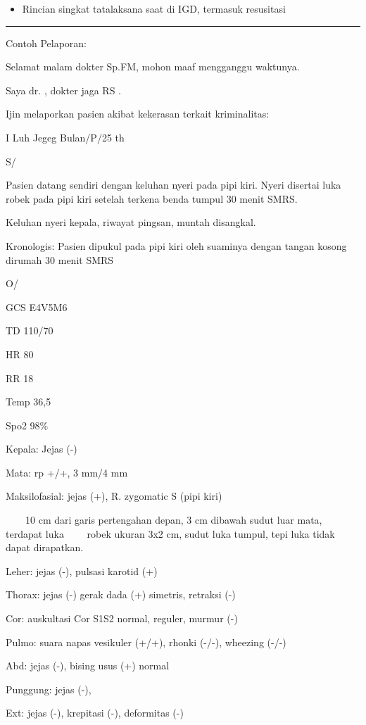 \documentclass[
]{book}
\providecommand{\tightlist}{%
  \setlength{\itemsep}{0pt}\setlength{\parskip}{0pt}}
\begin{document}
\begin{itemize}
\tightlist
\item
  Rincian singkat tatalaksana saat di IGD, termasuk resusitasi
\end{itemize}

\begin{center}\rule{0.5\linewidth}{0.5pt}\end{center}

Contoh Pelaporan:

Selamat malam dokter Sp.FM, mohon maaf mengganggu waktunya.

Saya dr. , dokter jaga RS .

Ijin melaporkan pasien akibat kekerasan terkait kriminalitas:

I Luh Jegeg Bulan/P/25 th

S/

Pasien datang sendiri dengan keluhan nyeri pada pipi kiri. Nyeri disertai luka robek pada pipi kiri setelah terkena benda tumpul 30 menit SMRS.

Keluhan nyeri kepala, riwayat pingsan, muntah disangkal.

Kronologis: Pasien dipukul pada pipi kiri oleh suaminya dengan tangan kosong dirumah 30 menit SMRS

O/

GCS E4V5M6

TD 110/70

HR 80

RR 18

Temp 36,5

Spo2 98\%

Kepala: Jejas (-)

Mata: rp +/+, 3 mm/4 mm

Maksilofasial: jejas (+), R. zygomatic S (pipi kiri)

~~~~10 cm dari garis pertengahan depan, 3 cm dibawah sudut luar mata, terdapat luka ~~~~robek ukuran 3x2 cm, sudut luka tumpul, tepi luka tidak dapat dirapatkan.

Leher: jejas (-), pulsasi karotid (+)

Thorax: jejas (-) gerak dada (+) simetris, retraksi (-)

Cor: auskultasi Cor S1S2 normal, reguler, murmur (-)

Pulmo: suara napas vesikuler (+/+), rhonki (-/-), wheezing (-/-)

Abd: jejas (-), bising usus (+) normal

Punggung: jejas (-),

Ext: jejas (-), krepitasi (-), deformitas (-)
\end{document}
